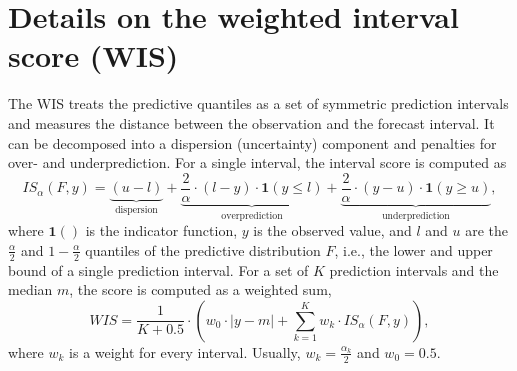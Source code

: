 \documentclass[
]{jss}
\begin{document}
\clearpage

\section{Details on the weighted interval score (WIS)} \label{sec:wis}

The WIS treats the predictive quantiles as a set of symmetric prediction
intervals and measures the distance between the observation and the
forecast interval. It can be decomposed into a dispersion (uncertainty)
component and penalties for over- and underprediction. For a single
interval, the interval score is computed as
\[IS_\alpha(F,y) = \underbrace{(u-l)}_\text{dispersion} + \underbrace{\frac{2}{\alpha} \cdot (l-y) \cdot \mathbf{1}(y \leq l)}_{\text{overprediction}} + \underbrace{\frac{2}{\alpha} \cdot (y-u) \cdot \mathbf{1}(y \geq u)}_{\text{underprediction}}, \]
where \(\mathbf{1}()\) is the indicator function, \(y\) is the observed
value, and \(l\) and \(u\) are the \(\frac{\alpha}{2}\) and
\(1 - \frac{\alpha}{2}\) quantiles of the predictive distribution \(F\),
i.e., the lower and upper bound of a single prediction interval. For a
set of \(K\) prediction intervals and the median \(m\), the score is
computed as a weighted sum,
\[WIS = \frac{1}{K + 0.5} \cdot \left(w_0 \cdot |y - m| + \sum_{k = 1}^{K} w_k \cdot IS_{\alpha}(F, y)\right),\]
where \(w_k\) is a weight for every interval. Usually,
\(w_k = \frac{\alpha_k}{2}\) and \(w_0 = 0.5\).

\clearpage
\end{document}
